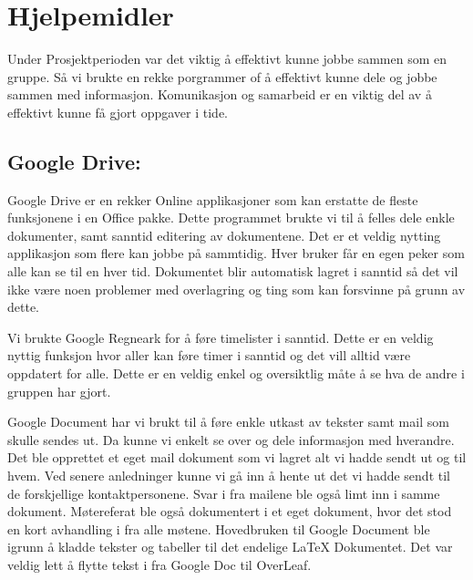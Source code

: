 
\section {Hjelpemidler}

Under Prosjektperioden var det viktig å effektivt kunne jobbe sammen som en gruppe. Så vi brukte en rekke porgrammer of å effektivt kunne dele og jobbe sammen med informasjon. Komunikasjon og samarbeid er en viktig del av å effektivt kunne få gjort oppgaver i tide.

\vspace{20pt}
\subsection{Google Drive:}
\vspace{10pt}
Google Drive er en rekker Online applikasjoner som kan erstatte de fleste funksjonene i en Office pakke. Dette programmet brukte vi til å felles dele enkle dokumenter, samt sanntid editering av dokumentene.\cite {Googledocs} Det er et veldig nytting applikasjon som flere kan jobbe på sammtidig. Hver bruker får en egen peker som alle kan se til en hver tid. Dokumentet blir automatisk lagret i sanntid så det vil ikke være noen problemer med overlagring og ting som kan forsvinne på grunn av dette.\newline

\hspace{-17pt}Vi brukte Google Regneark for å føre timelister i sanntid. Dette er en veldig nyttig funksjon hvor aller kan føre timer i sanntid og det vill alltid være oppdatert for alle. Dette er en veldig enkel og oversiktlig måte å se hva de andre i gruppen har gjort.\newline

\hspace{-17pt}Google Document har vi brukt til å føre enkle utkast av tekster samt mail som skulle sendes ut. Da kunne vi enkelt se over og dele informasjon med hverandre. Det ble opprettet et eget mail dokument som vi lagret alt vi hadde sendt ut og til hvem. Ved senere anledninger kunne vi gå inn å hente ut det vi hadde sendt til de forskjellige kontaktpersonene. Svar i fra mailene ble også limt inn i samme dokument.
Møtereferat ble også dokumentert i et eget dokument, hvor det stod en kort avhandling i fra alle møtene.
Hovedbruken til Google Document ble igrunn å kladde tekster og tabeller til det endelige LaTeX Dokumentet. Det var veldig lett å flytte tekst i fra Google Doc til OverLeaf.\newline


